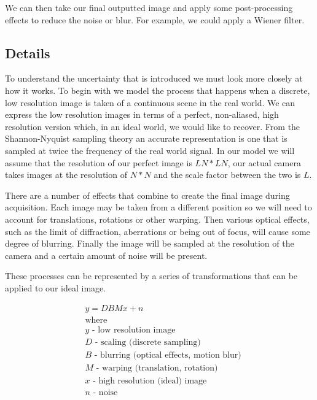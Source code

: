 We can then take our final outputted image and apply some post-processing effects to reduce the noise or blur. For example, we could apply a Wiener filter\cite{wienerfilter}.

\subsection*{Details}
To understand the uncertainty that is introduced we must look more closely at how it works.
To begin with we model the process that happens when a discrete, low resolution image is taken of a continuous scene in the real world. We can express the low resolution images in terms of a perfect, non-aliased, high resolution version which, in an ideal world, we would like to recover. From the Shannon-Nyquist sampling theory an accurate representation is one that is sampled at twice the frequency of the real world signal\cite{shannonnyquist}. In our model we will assume that the resolution of our perfect image is $LN * LN$, our actual camera takes images at the resolution of $N * N$ and the scale factor between the two is $L$.

There are a number of effects that combine to create the final image during acquisition. Each image may be taken from a different position so we will need to account for translations, rotations or other warping. Then various optical effects, such as the limit of diffraction, aberrations or being out of focus, will cause some degree of blurring. Finally the image will be sampled at the resolution of the camera and a certain amount of noise will be present.

These processes can be represented by a series of transformations that can be applied to our ideal image.

\begin{align*} 
& y = DBMx + n \nonumber \\ 
& \text{where} \\
& y \text{ - low resolution image} \nonumber \\
& D \text{ - scaling (discrete sampling)} \nonumber \\
& B \text{ - blurring (optical effects, motion blur)} \nonumber \\
& M \text{ - warping (translation, rotation)} \nonumber \\
& x \text{ - high resolution (ideal) image} \nonumber \\
& n \text{ - noise} \nonumber
\end{align*}


